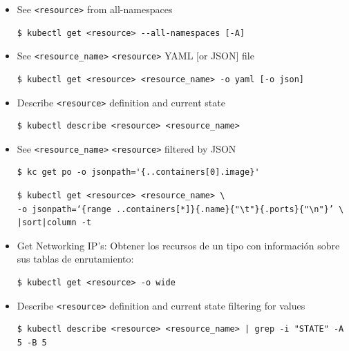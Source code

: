 \documentclass{article}
\newenvironment{codetemplate}[1][]{%
  \mybasecolorbox[#1]
  \itshape
}{%
  \endmybasecolorbox
}
\begin{document}
\begin{itemize}
    \item See \verb|<resource>| from all-namespaces
\begin{codetemplate}{}
\begin{verbatim}
$ kubectl get <resource> --all-namespaces [-A]
\end{verbatim}
\end{codetemplate}

    \item See \verb|<resource_name>| \verb|<resource>| YAML [or JSON] file
\begin{codetemplate}{}
\begin{verbatim}
$ kubectl get <resource> <resource_name> -o yaml [-o json]
\end{verbatim}
\end{codetemplate}

    \item Describe \verb|<resource>| definition and current state
\begin{codetemplate}{}
\begin{verbatim}
$ kubectl describe <resource> <resource_name>
\end{verbatim}
\end{codetemplate}

    \item See \verb|<resource_name>| \verb|<resource>| filtered by JSON

\begin{codetemplate}{}
\begin{verbatim}
$ kc get po -o jsonpath='{..containers[0].image}'
\end{verbatim}
\end{codetemplate}
\begin{codetemplate}{}
\begin{verbatim}
$ kubectl get <resource> <resource_name> \
-o jsonpath=‘{range ..containers[*]}{.name}{"\t"}{.ports}{"\n"}’ \
|sort|column -t
\end{verbatim}
\end{codetemplate}

    \item Get Networking IP’s: Obtener los recursos de un tipo con información sobre sus tablas de enrutamiento:
\begin{codetemplate}{}
\begin{verbatim}
$ kubectl get <resource> -o wide
\end{verbatim}
\end{codetemplate}

    \item Describe \verb|<resource>| definition and current state filtering for values
\begin{codetemplate}{}
\begin{verbatim}
$ kubectl describe <resource> <resource_name> | grep -i "STATE" -A 5 -B 5
\end{verbatim}
\end{codetemplate}
\end{itemize}
\end{document}
